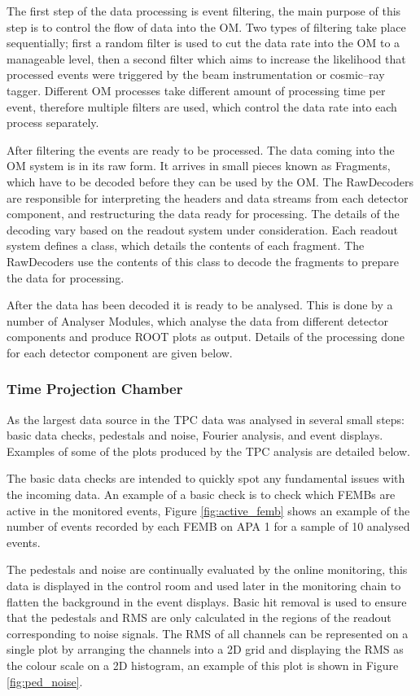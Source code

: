 The first step of the data processing is event filtering, the main purpose of
this step is to control the flow of data into the OM. Two types of filtering
take place sequentially; first a random filter is used to cut the data rate into
the OM to a manageable level, then a second filter which aims to increase the 
likelihood that processed events were triggered by the beam instrumentation or 
cosmic--ray tagger. Different OM processes take different amount of
processing time per event, therefore multiple filters are used, which control 
the data rate into each process separately.

After filtering the events are ready to be processed. The data coming into the
OM system is in its raw form. It arrives in small pieces known as Fragments,
which have to be decoded before they can be used by the OM. The RawDecoders 
are responsible for interpreting the headers and data streams from each 
detector component, and restructuring the data ready for processing. The 
details of the decoding vary based on the readout system under consideration. 
Each readout system defines a class, which details the contents of each
fragment. The RawDecoders use the contents of this class to decode the fragments
to prepare the data for processing.

After the data has been decoded it is ready to be analysed. This is done by a
number of Analyser Modules, which analyse the data from different detector
components and produce ROOT \cite{ANTCHEVA20092499} plots as output. Details 
of the processing done for each detector component are given below.

\subsubsection*{Time Projection Chamber}
As the largest data source in \protodune{} the TPC data was analysed in several
small steps: basic data checks, pedestals and noise, Fourier analysis, and event
displays. Examples of some of the plots produced by the TPC analysis are
detailed below.

The basic data checks are intended to quickly spot any fundamental issues with
the incoming data. An example of a basic check is to check which FEMBs are
active in the monitored events, Figure \ref{fig:active_femb} shows an example of
the number of events recorded by each FEMB on APA 1 for a sample of 10 analysed
events.

The pedestals and noise are continually evaluated by the online monitoring, this
data is displayed in the control room and used later in the monitoring chain to
flatten the background in the event displays. Basic hit removal is used to 
ensure that the pedestals and RMS are only calculated in the regions of the 
readout corresponding to noise signals. The RMS of all channels can be
represented on a single plot by arranging the channels into a 2D grid and
displaying the RMS as the colour scale on a 2D histogram, an example of this
plot is shown in Figure \ref{fig:ped_noise}.

